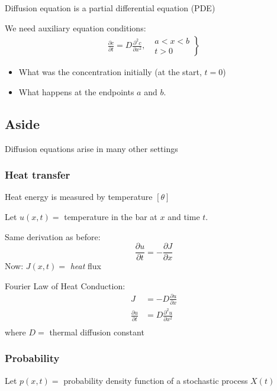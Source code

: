 \documentclass[
	date={September 4{,} 2024}
]{math486notes}
\begin{document}
Diffusion equation is a partial differential equation (PDE)

We need auxiliary equation conditions:
\begin{equation*}
\begin{aligned}
	\frac{\partial c}{\partial t} = D\frac{\partial^{2} c}{\partial x^{2}},\ \ \  \left. \begin{array}{c}
		a < x < b\\
		t > 0
	\end{array} \right\}
\end{aligned}
\end{equation*}

\begin{itemize}
	\item What was the concentration initially (at the start, $t=0$)
	\item What happens at the endpoints $a$ and $b$.
\end{itemize}

\subsection{Aside}\label{subsec:aside}
Diffusion equations arise in many other settings\\
\subsubsection{Heat transfer}\label{subsubsec:heat-transfer}
Heat energy is measured by temperature $[\theta]$

Let $u(x,t) = $ temperature in the bar at $x$ and time $t$.

Same derivation as before:
\[ \frac{\partial u}{\partial t} = -\frac{\partial J}{\partial x} \]
Now: $J(x,t) = $ \textit{heat} flux

Fourier Law of Heat Conduction:
\begin{equation}
\begin{aligned}
	J &= -D\frac{\partial u}{\partial x}\\
	\frac{\partial u}{\partial t} &= D\frac{\partial^{2}u}{\partial x^{2}}\\
\end{aligned}
	\label{eq:fourier-heat}
\end{equation}
where $D=$ thermal diffusion constant

\subsubsection{Probability}\label{subsubsec:probability}
Let $p(x,t) = $ probability density function of a stochastic process $X(t)$
\end{document}
